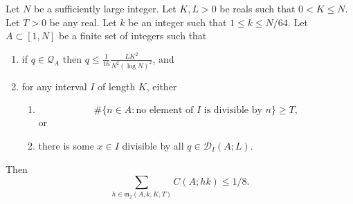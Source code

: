 \begin{lemma}\label{lem:minor2_bound}
  \leanok
Let $N$ be a sufficiently large integer. Let $K,L>0$ be reals such that $0<K\leq N$. Let $T>0$ be any real. Let $k$ be an integer such that $1\leq k \leq N/64$.  Let $A\subset [1,N]$ be a finite set of integers such that
\begin{enumerate}
\item if $q\in\mathcal{Q}_A$ then $q\leq \tfrac{1}{16}\frac{LK^2}{N^2(\log N)^2}$,  and
\item for any interval $I$ of length $K$, either
\begin{enumerate}
\item \[\# \{ n\in A : \textrm{no element of }I\textrm{ is divisible by }n\}\geq T,\]
or
\item there is some $x\in I$ divisible by all $q\in\mathcal{D}_I(A;L)$.
\end{enumerate}
\end{enumerate}
Then
\[\sum_{h\in\mathfrak{m}_2(A,k,K,T)}C(A;hk)\leq 1/8.\]
\end{lemma}
